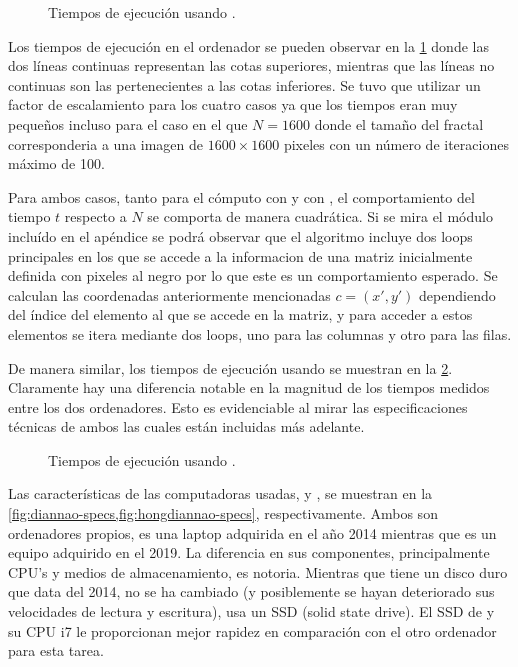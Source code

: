 \begin{figure}[ht!]
    \centering
    
    \caption{Tiempos de ejecución usando {\diannao}.}
    \label{fig:times-diannao}
\end{figure}

Los tiempos de ejecución en el ordenador {\diannao} se pueden observar en la \cref{fig:times-diannao} donde las dos líneas continuas representan las cotas superiores, mientras que las líneas no continuas son las pertenecientes a las cotas inferiores. Se tuvo que utilizar un factor de escalamiento para los cuatro casos ya que los tiempos eran muy pequeños incluso para el caso en el que $N = 1600$ donde el tamaño del fractal corresponderia a una imagen de $1600 \times 1600$ pixeles con un número de iteraciones máximo de 100.

Para ambos casos, tanto para el cómputo con {\diannao} y con {\hongdiannao}, el comportamiento del tiempo $t$ respecto a $N$ se comporta de manera cuadrática. Si se mira el módulo incluído en el apéndice se podrá observar que el algoritmo incluye dos  loops principales en los que se accede a la informacion de una matriz inicialmente definida con pixeles al negro  por lo que este es un comportamiento esperado. Se calculan las coordenadas anteriormente mencionadas $c = (x', y')$ dependiendo del índice del elemento al que se accede en la matriz, y para acceder a estos elementos se itera mediante dos  loops, uno para las columnas y otro para las filas. 

De manera similar, los tiempos de ejecución usando {\hongdiannao} se muestran en la \cref{fig:times-hongdiannao}. Claramente hay una diferencia notable en la magnitud de los tiempos medidos entre los dos ordenadores. Esto es evidenciable al mirar las especificaciones técnicas de ambos las cuales están incluidas más adelante.
\begin{figure}[ht!]
    \centering
    
    \caption{Tiempos de ejecución usando {\hongdiannao}.}
    \label{fig:times-hongdiannao}
\end{figure}
Las características de las computadoras usadas, {\diannao} y {\hongdiannao}, se muestran en la \cref{fig:diannao-specs,fig:hongdiannao-specs}, respectivamente. Ambos son ordenadores propios, {\hongdiannao} es una laptop adquirida en el año 2014 mientras que {\diannao} es un equipo adquirido en el 2019. La diferencia en sus componentes, principalmente CPU's y medios de almacenamiento, es notoria. Mientras que {\hongdiannao} tiene un disco duro que data del 2014, no se ha cambiado (y posiblemente se hayan deteriorado sus velocidades de lectura y escritura), {\diannao} usa un SSD (solid state drive). El SSD de {\diannao} y su CPU i7 le proporcionan mejor rapidez en comparación con el otro ordenador para esta tarea.


